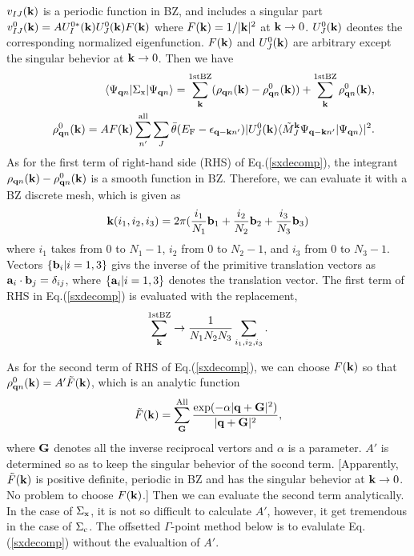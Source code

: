 \documentclass[a4paper,10pt,epsf,fleqn]{article}
\begin{document}
$v_{IJ}({\bf k})$ is a periodic function in BZ,
and includes a singular part 
$v^0_{IJ}({\bf k})= A U^{0*}_I({\bf k}) U^{0}_J({\bf k}) F({\bf k})$
where $F({\bf k}) = 1/|{\bf k}|^2$ at ${\bf k} \to 0$.
$U^{0}_J({\bf k})$ deontes the corresponding normalized eigenfunction.
$F({\bf k})$ and $U^{0}_J({\bf k})$ are arbitrary except the singular behevior at ${\bf k} \to 0$.
Then we have
\begin{eqnarray}
&&\langle \Psi_{{\bf q}n}|\Sigma_{\rm x} |\Psi_{{\bf q}n} \rangle
= \sum_{\bf k}^{\rm 1st BZ} (\rho_{{\bf q}n}({\bf k}) - \rho^0_{{\bf q}n}({\bf k}))
 +\sum_{\bf k}^{\rm 1st BZ}  \rho^0_{{\bf q}n}({\bf k}), \label{sxdecomp}\\
&&\rho^0_{{\bf q}n}({\bf k})
 = A F({\bf k}) \sum^{\rm  all}_{n'} \sum_J \bar{\theta}(E_{\rm F}-\epsilon_{{\bf q- k} n'})
| U^{0}_J({\bf k}) \langle \tilde{M}^{\bf k}_J \Psi_{{\bf q-k}n'} | \Psi_{{\bf q}n} \rangle |^2.
\end{eqnarray}
As for the first term of right-hand side (RHS) of Eq.(\ref{sxdecomp}), 
the integrant $\rho_{{\bf q}n}({\bf k}) - \rho^0_{{\bf q}n}({\bf k})$
is a smooth function in BZ. Therefore, we can evaluate it
with a BZ discrete mesh, which is given as
\begin{eqnarray}
{\bf k}(i_1,i_2,i_3)= 2 \pi (\frac{i_1}{N_1} {\bf b}_1 
+ \frac{i_2}{N_2} {\bf b}_2 + \frac{i_3}{N_3} {\bf b}_3)
\label{kmesh}
\end{eqnarray}
where $i_1$ takes from 0 to $N_1-1$, $i_2$ from 0 to $N_2-1$, and $i_3$ from 0 to $N_3-1$.
Vectors $\{ {\bf b}_i| i=1,3\}$ givs the inverse of
the primitive translation vectors as ${\bf a}_i \cdot {\bf b}_j= \delta_{ij}$,
where $\{ {\bf a}_i| i=1,3\}$ denotes the translation vector.
The first term of RHS in Eq.(\ref{sxdecomp}) is evaluated with the replacement,
\begin{eqnarray}
\sum_{\bf k}^{\rm 1st BZ} \to \frac{1}{N_1N_2N_3} \sum_{i_1,i_2,i_3}.
\end{eqnarray}

As for the second term of RHS of Eq.(\ref{sxdecomp}),
we can choose $F({\bf k})$ so that $\rho^0_{{\bf q}n}({\bf k})= A' \tilde{F}({\bf k})$,
which is an analytic function
\begin{eqnarray}
\tilde{F}({\bf k})=\sum^{\rm All}_{\bf G} \frac{\exp(-\alpha |{\bf q + G}|^2) }{|{\bf q + G}|^2 },
\end{eqnarray}
where ${\bf G}$ denotes all the inverse reciprocal vertors and $\alpha$ is a parameter.
$A'$ is determined so as to keep the singular behevior of the socond term.
[Apparently, $\tilde{F}({\bf k})$ is positive definite, periodic in BZ and has the singular behevior at ${\bf k} \to 0$.
No problem to choose $F({\bf k})$.]
Then we can evaluate the second term analytically.
In the case of $\Sigma_{\rm x}$, it is not so difficult to calculate $A'$, however,
it get tremendous in the case of $\Sigma_{\rm c}$. The offsetted $\Gamma$-point method below
is to evalulate Eq.(\ref{sxdecomp}) without the evalualtion of $A'$.
\end{document}
